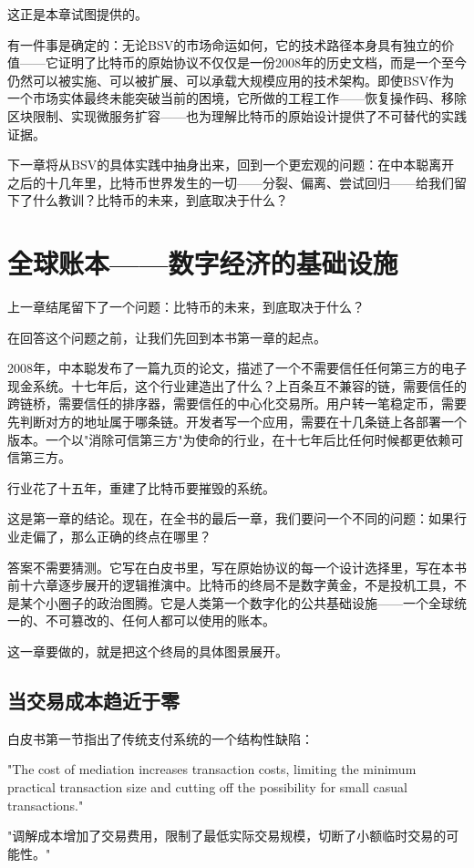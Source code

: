 \documentclass[a4paper,12pt,openany]{ctexbook}
\newenvironment{quoting}{%
  \par\vspace{0.5em}%
  \begin{list}{}{%
    \setlength{\leftmargin}{2em}%
    \setlength{\rightmargin}{2em}%
    \setlength{\parsep}{0.3em}%
    \setlength{\itemsep}{0pt}%
    \setlength{\topsep}{0pt}%
  }%
  \item\relax
}{%
  \end{list}%
  \par\vspace{0.5em}%
}
\begin{document}
这正是本章试图提供的。

有一件事是确定的：无论BSV的市场命运如何，它的技术路径本身具有独立的价值——它证明了比特币的原始协议不仅仅是一份2008年的历史文档，而是一个至今仍然可以被实施、可以被扩展、可以承载大规模应用的技术架构。即使BSV作为一个市场实体最终未能突破当前的困境，它所做的工程工作——恢复操作码、移除区块限制、实现微服务扩容——也为理解比特币的原始设计提供了不可替代的实践证据。

下一章将从BSV的具体实践中抽身出来，回到一个更宏观的问题：在中本聪离开之后的十几年里，比特币世界发生的一切——分裂、偏离、尝试回归——给我们留下了什么教训？比特币的未来，到底取决于什么？



\chapter{全球账本——数字经济的基础设施}


上一章结尾留下了一个问题：比特币的未来，到底取决于什么？

在回答这个问题之前，让我们先回到本书第一章的起点。

2008年，中本聪发布了一篇九页的论文，描述了一个不需要信任任何第三方的电子现金系统。十七年后，这个行业建造出了什么？上百条互不兼容的链，需要信任的跨链桥，需要信任的排序器，需要信任的中心化交易所。用户转一笔稳定币，需要先判断对方的地址属于哪条链。开发者写一个应用，需要在十几条链上各部署一个版本。一个以"消除可信第三方"为使命的行业，在十七年后比任何时候都更依赖可信第三方。

行业花了十五年，重建了比特币要摧毁的系统。

这是第一章的结论。现在，在全书的最后一章，我们要问一个不同的问题：如果行业走偏了，那么正确的终点在哪里？

答案不需要猜测。它写在白皮书里，写在原始协议的每一个设计选择里，写在本书前十六章逐步展开的逻辑推演中。比特币的终局不是数字黄金，不是投机工具，不是某个小圈子的政治图腾。它是人类第一个数字化的公共基础设施——一个全球统一的、不可篡改的、任何人都可以使用的账本。

这一章要做的，就是把这个终局的具体图景展开。


\section*{当交易成本趋近于零}


白皮书第一节指出了传统支付系统的一个结构性缺陷：


\begin{quoting}
\small
"The cost of mediation increases transaction costs, limiting the minimum practical transaction size and cutting off the possibility for small casual transactions."

"调解成本增加了交易费用，限制了最低实际交易规模，切断了小额临时交易的可能性。"
\end{quoting}
\end{document}
